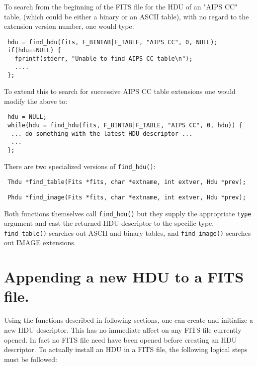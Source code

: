 To search from the beginning of the FITS file for the HDU of an
"AIPS CC" table, (which could be either a binary or an ASCII table),
with no regard to the extension version number, one would type.
\begin{verbatim}
 hdu = find_hdu(fits, F_BINTAB|F_TABLE, "AIPS CC", 0, NULL);
 if(hdu==NULL) {
   fprintf(stderr, "Unable to find AIPS CC table\n");
   ....
 };
\end{verbatim}
To extend this to search for successive AIPS CC table extensions one
would modify the above to:
\begin{verbatim}
 hdu = NULL;
 while(hdu = find_hdu(fits, F_BINTAB|F_TABLE, "AIPS CC", 0, hdu)) {
  ... do something with the latest HDU descriptor ...
  ...
 };
\end{verbatim}
There are two specialized versions of \verb`find_hdu()`:
\label{find_table}\begin{verbatim}
 Thdu *find_table(Fits *fits, char *extname, int extver, Hdu *prev);
\end{verbatim}
\label{find_image}\begin{verbatim}
 Phdu *find_image(Fits *fits, char *extname, int extver, Hdu *prev);
\end{verbatim}
Both functions themselves call \verb`find_hdu()` but they supply the appropriate
\verb`type` argument and cast the returned HDU descriptor to the specific
type. \verb`find_table()` searches out ASCII and binary tables, and
\verb`find_image()` searches out IMAGE extensions.


\section{Appending a new HDU to a FITS file.}

Using the functions described in following sections, one can create and
initialize a new HDU descriptor. This has no immediate affect on any
FITS file currently opened. In fact no FITS file need have been opened
before creating an HDU descriptor. To actually install an HDU in a
FITS file, the following logical steps must be followed:

